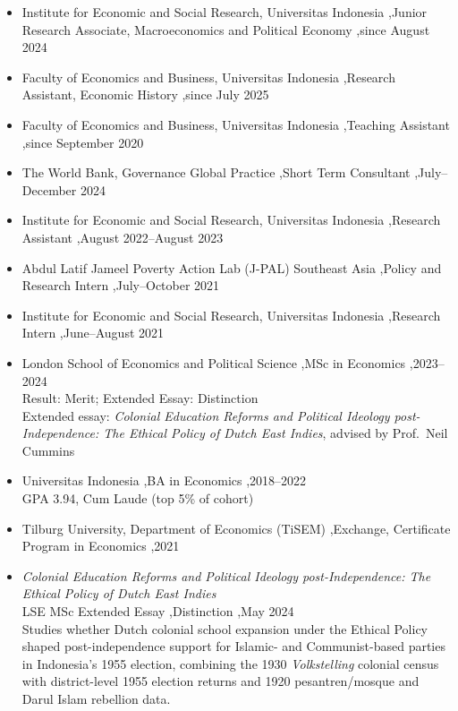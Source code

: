 \documentclass[letterpaper,10pt]{article}
\begin{document}


\begin{itemize}
\item Institute for Economic and Social Research, Universitas Indonesia \sep Junior Research Associate, Macroeconomics and Political Economy \sep since August 2024
\item Faculty of Economics and Business, Universitas Indonesia \sep Research Assistant, Economic History \sep since July 2025
\item Faculty of Economics and Business, Universitas Indonesia \sep Teaching Assistant \sep since September 2020
\item The World Bank, Governance Global Practice \sep Short Term Consultant \sep July--December 2024
\item Institute for Economic and Social Research, Universitas Indonesia \sep Research Assistant \sep August 2022--August 2023
\item Abdul Latif Jameel Poverty Action Lab (J-PAL) Southeast Asia \sep Policy and Research Intern \sep July--October 2021
\item Institute for Economic and Social Research, Universitas Indonesia \sep Research Intern \sep June--August 2021
\end{itemize}


\begin{itemize}
\item London School of Economics and Political Science \sep MSc in Economics \sep 2023--2024\\
Result: Merit; Extended Essay: Distinction\\
Extended essay: \textit{Colonial Education Reforms and Political Ideology post-Independence: The Ethical Policy of Dutch East Indies}, advised by Prof.\ Neil Cummins
\item Universitas Indonesia \sep BA in Economics \sep 2018--2022\\
GPA 3.94, Cum Laude (top 5\% of cohort)
\item Tilburg University, Department of Economics (TiSEM) \sep Exchange, Certificate Program in Economics \sep 2021
\end{itemize}


\begin{itemize}
\item \textit{Colonial Education Reforms and Political Ideology post-Independence: The Ethical Policy of Dutch East Indies}\\
LSE MSc Extended Essay \sep Distinction \sep May 2024\\
Studies whether Dutch colonial school expansion under the Ethical Policy shaped post-independence support for Islamic- and Communist-based parties in Indonesia's 1955 election, combining the 1930 \textit{Volkstelling} colonial census with district-level 1955 election returns and 1920 pesantren/mosque and Darul Islam rebellion data.
\end{itemize}
\end{document}
